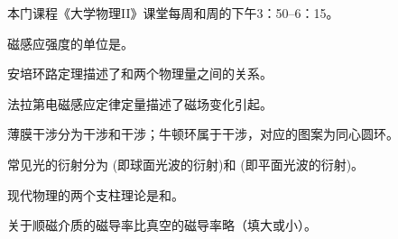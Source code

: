 \documentclass{njustexam}
\begin{document}
\begin{problem} 
  本门课程《大学物理II》课堂每周和周的下午3：50--6：15。
\end{problem} 


\begin{problem}
磁感应强度的单位是。
\end{problem}


\begin{problem}
  安培环路定理描述了和两个物理量之间的关系。
\end{problem}


\begin{problem}
  法拉第电磁感应定律定量描述了磁场变化引起。
\end{problem}

\begin{problem}
薄膜干涉分为干涉和干涉；牛顿环属于干涉，对应的图案为同心圆环。
\end{problem}

\begin{problem}
  常见光的衍射分为 (即球面光波的衍射)和 (即平面光波的衍射)。
 \end{problem}

 \begin{problem}
  现代物理的两个支柱理论是和。
\end{problem}




\begin{problem}

    关于顺磁介质的磁导率比真空的磁导率略（填大或小）。
\end{problem}
\end{document}
